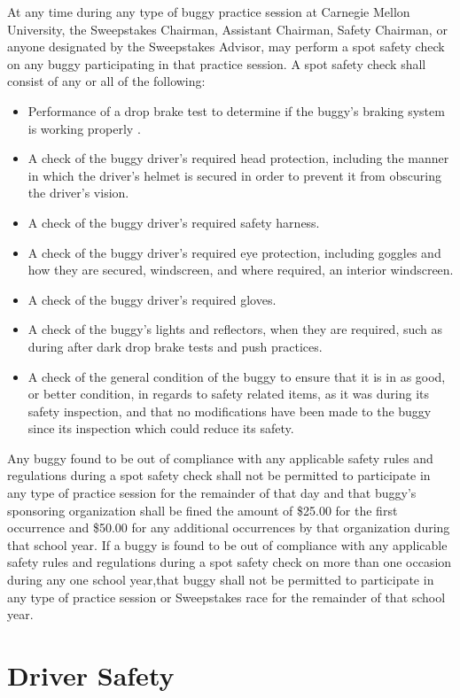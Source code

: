 \documentclass[openany]{book}
\begin{document}
At any time during any type of buggy practice session at Carnegie Mellon University, the Sweepstakes Chairman, Assistant Chairman, Safety Chairman, or anyone designated by the Sweepstakes Advisor, may perform a spot safety check on any buggy participating in that practice session. A spot safety check shall consist of any or all of the following:
\begin{itemize}
	\item Performance of a drop brake test to determine if the buggy's braking system is working properly .
	\item A check of the buggy driver's required head protection, including the manner in which the driver's helmet is secured in order to prevent it from obscuring the driver's vision.
	\item A check of the buggy driver's required safety harness.
	\item A check of the buggy driver's required eye protection, including goggles and how they are secured, windscreen, and where required, an interior windscreen.
	\item A check of the buggy driver's required gloves.
	\item A check of the buggy's lights and reflectors, when they are required, such as during after dark drop brake tests and push practices.
	\item A check of the general condition of the buggy to ensure that it is in as good, or better condition, in regards to safety related items, as it was during its safety inspection, and that no modifications have been made to the buggy since its inspection which could reduce its safety.
\end{itemize}

Any buggy found to be out of compliance with any applicable safety rules and regulations during a spot safety check shall not be permitted to participate in any type of practice session for the remainder of that day and that buggy's sponsoring organization shall be fined the amount of \$25.00 for the first occurrence and \$50.00 for any additional occurrences by that organization during that school year. If a buggy is found to be out of compliance with any applicable safety rules and regulations during a spot safety check on more than one occasion during any one school year,that buggy shall not be permitted to participate in any type of practice session or Sweepstakes race for the remainder of that school year.

\section{Driver Safety}
\end{document}
